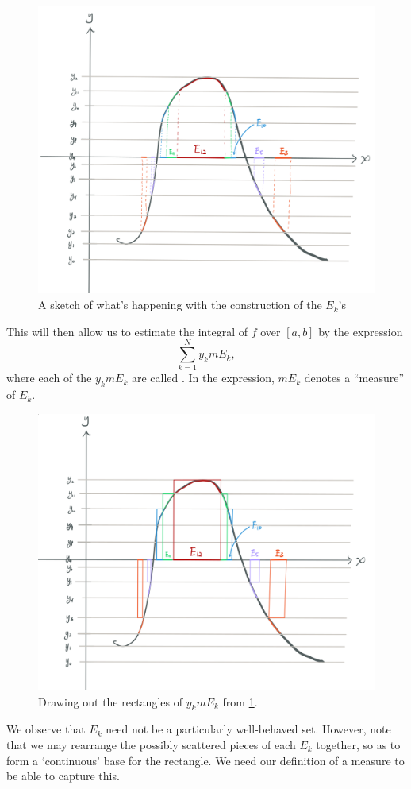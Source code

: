\documentclass[notoc,notitlepage]{tufte-book}
\begin{document}
\begin{figure}[ht]
  \centering
  \includegraphics[width=0.5\linewidth]{images/heuristic_into_lesbesgue_integration.png}
  \caption{A sketch of what's happening with the construction of the $E_k$'s}
  \label{fig:a_sketch_of_what_s_happening_with_the_construction_of_the_e_k_s}
\end{figure}

This will then allow us to estimate the integral of $f$ over $[a, b]$ by the
expression
\begin{equation*}
  \sum_{k=1}^{N} y_k m E_k,
\end{equation*}
where each of the $y_k m E_k$ are called . In the
expression, $mE_k$ denotes a ``measure''  of $E_k$.

\begin{figure}[ht]
  \centering
  \includegraphics[width=0.5\linewidth]{images/heuristic_into_lesbesgue_integration_heaps.png}
  \caption{Drawing out the rectangles of $y_k mE_k$ from
  \cref{fig:a_sketch_of_what_s_happening_with_the_construction_of_the_e_k_s}.}
  \label{fig:drawing_out_the_rectangles_of_y_k_me_k_from_fig_}
\end{figure}

We observe that $E_k$ need not be a particularly well-behaved set. However, note
that we may rearrange the possibly scattered pieces of each $E_k$ together, so
as to form a `continuous' base for the rectangle. We need our definition of a
measure to be able to capture this.
\end{document}

